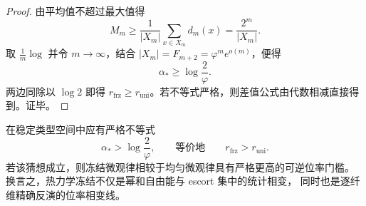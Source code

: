 \begin{proof}
由平均值不超过最大值得
\[
M_m\ge \frac{1}{|X_m|}\sum_{x\in X_m}d_m(x)=\frac{2^m}{|X_m|}.
\]
取 \(\frac1m\log\) 并令 \(m\to\infty\)，结合 \(|X_m|=F_{m+2}=\varphi^m e^{o(m)}\)，便得
\[
\alpha_\ast\ge \log\frac{2}{\varphi}.
\]
两边同除以 \(\log 2\) 即得 \(r_{\mathrm{frz}}\ge r_{\mathrm{uni}}\)。若不等式严格，则差值公式由代数相减直接得到。证毕。
\end{proof}

\begin{conjecture}[双阈值间隙的严格正性]\label{conj:conclusion-microescort-bitrate-gap-positive}
在稳定类型空间中应有严格不等式
\[
\alpha_\ast>\log\frac{2}{\varphi},
\qquad\text{等价地}\qquad
r_{\mathrm{frz}}>r_{\mathrm{uni}}.
\]
若该猜想成立，则冻结微观律相较于均匀微观律具有严格更高的可逆位率门槛。
换言之，热力学冻结不仅是幂和自由能与 escort 集中的统计相变，
同时也是逐纤维精确反演的位率相变线。
\end{conjecture}

\endinput
